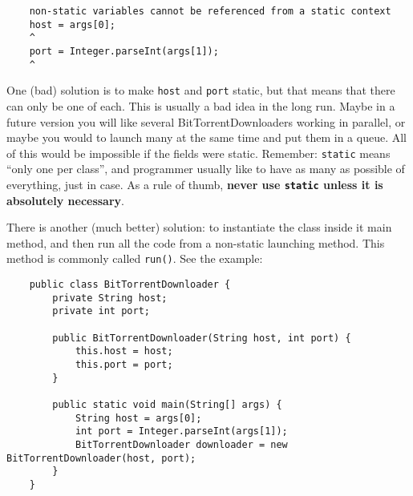 \begin{verbatim}
    non-static variables cannot be referenced from a static context
    host = args[0];
    ^
    port = Integer.parseInt(args[1]);
    ^
\end{verbatim}

One (bad) solution is to make \verb+host+ and \verb+port+ static, but
that means that there can only be one of each. This is usually a bad
idea in the long run. Maybe in a future version you will like several
BitTorrentDownloaders working in parallel, or maybe you would to
launch many at the same time and put them in a queue. All of this
would be impossible if the fields were static. Remember: \verb+static+
means ``only one per class'', and programmer usually like to have as
many as possible of everything, just in case. As a rule of thumb,
\textbf{never use \verb+static+ unless it is absolutely necessary}.

There is another (much better) solution: to instantiate the class
inside it main method, and then run all the code from a non-static
launching method. This method is commonly called \verb+run()+. See the
example: 

\begin{verbatim}
    public class BitTorrentDownloader {
        private String host;
        private int port;
    
        public BitTorrentDownloader(String host, int port) {
            this.host = host;
            this.port = port;
        }
    
        public static void main(String[] args) {
            String host = args[0];
            int port = Integer.parseInt(args[1]);
            BitTorrentDownloader downloader = new BitTorrentDownloader(host, port);
        }
    }
\end{verbatim}

